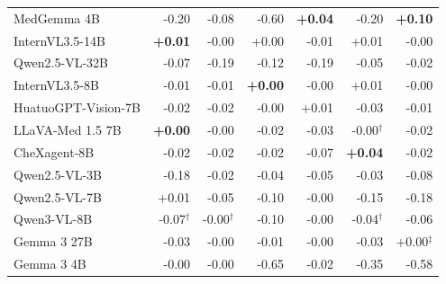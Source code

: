 \begin{table}[htbp]
\begin{tabular}{lrrrrrr}
MedGemma 4B & \cellcolor{cfTerra3}-0.20 & \cellcolor{cfTerra2}-0.08 & \cellcolor{cfTerra4}-0.60 & \cellcolor{cfSlate2}\textbf{+0.04} & \cellcolor{cfTerra3}-0.20 & \cellcolor{cfSlate3}\textbf{+0.10} \\
InternVL3.5-14B & \cellcolor{cfSlate1}\textbf{+0.01} & \cellcolor{cfTerra1}-0.00 & \cellcolor{cfSlate1}+0.00 & \cellcolor{cfTerra1}-0.01 & \cellcolor{cfSlate1}+0.01 & \cellcolor{cfTerra1}-0.00 \\
Qwen2.5-VL-32B & \cellcolor{cfTerra2}-0.07 & \cellcolor{cfTerra3}-0.19 & \cellcolor{cfTerra3}-0.12 & \cellcolor{cfTerra3}-0.19 & \cellcolor{cfTerra2}-0.05 & \cellcolor{cfTerra2}-0.02 \\
InternVL3.5-8B & \cellcolor{cfTerra1}-0.01 & \cellcolor{cfTerra1}-0.01 & \cellcolor{cfSlate1}\textbf{+0.00} & \cellcolor{cfTerra1}-0.00 & \cellcolor{cfSlate1}+0.01 & \cellcolor{cfTerra1}-0.00 \\
HuatuoGPT-Vision-7B & \cellcolor{cfTerra2}-0.02 & \cellcolor{cfTerra1}-0.02 & \cellcolor{cfTerra1}-0.00 & \cellcolor{cfSlate1}+0.01 & \cellcolor{cfTerra2}-0.03 & \cellcolor{cfTerra1}-0.01 \\
LLaVA-Med 1.5 7B & \cellcolor{cfSlate1}\textbf{+0.00} & \cellcolor{cfTerra1}-0.00 & \cellcolor{cfTerra2}-0.02 & \cellcolor{cfTerra2}-0.03 & \cellcolor{cfTerra1}-0.00$^{\dagger}$ & \cellcolor{cfTerra1}-0.02 \\
CheXagent-8B & \cellcolor{cfTerra2}-0.02 & \cellcolor{cfTerra1}-0.02 & \cellcolor{cfTerra2}-0.02 & \cellcolor{cfTerra2}-0.07 & \cellcolor{cfSlate2}\textbf{+0.04} & \cellcolor{cfTerra2}-0.02 \\
Qwen2.5-VL-3B & \cellcolor{cfTerra3}-0.18 & \cellcolor{cfTerra1}-0.02 & \cellcolor{cfTerra2}-0.04 & \cellcolor{cfTerra2}-0.05 & \cellcolor{cfTerra2}-0.03 & \cellcolor{cfTerra2}-0.08 \\
Qwen2.5-VL-7B & \cellcolor{cfSlate1}+0.01 & \cellcolor{cfTerra2}-0.05 & \cellcolor{cfTerra2}-0.10 & \cellcolor{cfTerra1}-0.00 & \cellcolor{cfTerra3}-0.15 & \cellcolor{cfTerra3}-0.18 \\
Qwen3-VL-8B & \cellcolor{cfTerra2}-0.07$^{\dagger}$ & \cellcolor{cfTerra1}-0.00$^{\dagger}$ & \cellcolor{cfTerra2}-0.10 & \cellcolor{cfTerra1}-0.00 & \cellcolor{cfTerra2}-0.04$^{\dagger}$ & \cellcolor{cfTerra2}-0.06 \\
Gemma 3 27B & \cellcolor{cfTerra2}-0.03 & \cellcolor{cfTerra1}-0.00 & \cellcolor{cfTerra1}-0.01 & \cellcolor{cfTerra1}-0.00 & \cellcolor{cfTerra2}-0.03 & \cellcolor{cfSlate1}+0.00$^{\ddagger}$ \\
Gemma 3 4B & \cellcolor{cfTerra1}-0.00 & \cellcolor{cfTerra1}-0.00 & \cellcolor{cfTerra4}-0.65 & \cellcolor{cfTerra1}-0.02 & \cellcolor{cfTerra4}-0.35 & \cellcolor{cfTerra4}-0.58 \\

\end{tabular}
\end{table}
